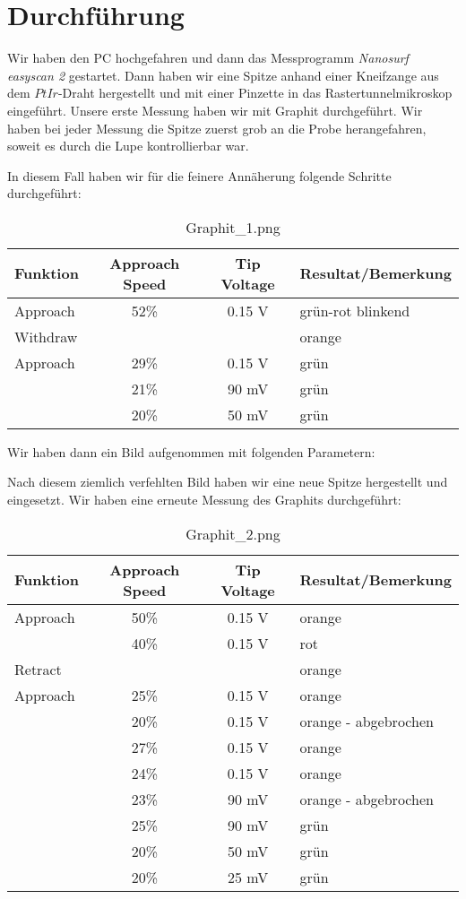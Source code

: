 \section{Durchführung}


Wir haben den PC hochgefahren und dann das Messprogramm \emph{Nanosurf easyscan 2} gestartet. Dann haben wir eine Spitze anhand einer Kneifzange aus dem $PtIr$-Draht hergestellt und mit einer Pinzette in das Rastertunnelmikroskop eingeführt. Unsere erste Messung haben wir mit Graphit durchgeführt. Wir haben bei jeder Messung die Spitze zuerst grob an die Probe herangefahren, soweit es durch die Lupe kontrollierbar war. 

In diesem Fall haben wir für die feinere Annäherung folgende Schritte durchgeführt:



\begin{table}[H]
\caption{Graphit\_1.png}
\centering \begin{tabular}[H]{l c c l}
Funktion & Approach Speed & Tip Voltage & Resultat/Bemerkung\\ \hline
Approach & 52\% & 0.15 V & grün-rot blinkend\\
Withdraw & & & orange\\
Approach & 29\% & 0.15 V & grün\\
 & 21\% & 90 mV & grün\\
 & 20\% & 50 mV & grün\\
\end{tabular}
\end{table}


Wir haben dann ein Bild aufgenommen mit folgenden Parametern:



Nach diesem ziemlich verfehlten Bild haben wir eine neue Spitze hergestellt und eingesetzt. Wir haben eine erneute Messung des Graphits durchgeführt: 

\begin{table}[H]
\caption{Graphit\_2.png}
\centering \begin{tabular}[H]{l c c l}
Funktion & Approach Speed & Tip Voltage & Resultat/Bemerkung\\ \hline
Approach & 50\% & 0.15 V & orange\\
 & 40\% & 0.15 V & rot\\
Retract & & & orange\\
Approach & 25\% & 0.15 V & orange\\
 & 20\% & 0.15 V & orange - abgebrochen\\
 & 27\% & 0.15 V & orange\\
 & 24\% & 0.15 V & orange\\
 & 23\% & 90 mV & orange - abgebrochen\\
 & 25\% & 90 mV & grün\\
 & 20\% & 50 mV & grün\\
 & 20\% & 25 mV & grün\\
\end{tabular}
\end{table}

